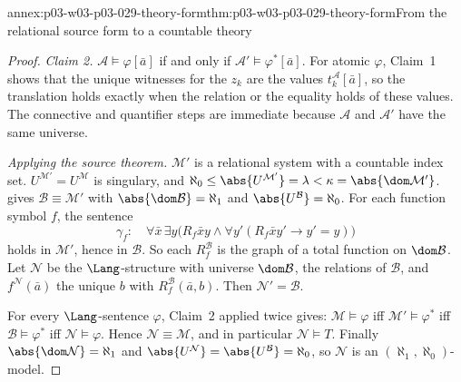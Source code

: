 \begin{annexitem}{annex:p03-w03-p03-029-theory-form}{thm:p03-w03-p03-029-theory-form}{From the relational source form to a countable theory}
\begin{proof}
\emph{Claim 2.} \(\mathcal A\models\varphi[\bar a]\) if and only if
\(\mathcal A'\models\varphi^*[\bar a]\). For atomic \(\varphi\), Claim~1
shows that the unique witnesses for the \(z_k\) are the values
\(t_k^{\mathcal A}[\bar a]\), so the translation holds exactly when the
relation or the equality holds of these values. The connective and
quantifier steps are immediate because \(\mathcal A\) and \(\mathcal A'\)
have the same universe.

\emph{Applying the source theorem.} \(\mathcal M'\) is a relational system
with a countable index set. \(U^{\mathcal M'}=U^{\mathcal M}\) is singulary,
and \(\aleph_0\leq\abs{U^{\mathcal M'}}=\lambda<\kappa=\abs{\dom\mathcal
M'}\).  gives \(\mathcal B\equiv\mathcal
M'\) with \(\abs{\dom\mathcal B}=\aleph_1\) and
\(\abs{U^{\mathcal B}}=\aleph_0\). For each function symbol \(f\), the
sentence
\[
  \gamma_f\colon\quad
  \forall\bar x\,\exists y\bigl(R_f\bar x y\wedge
  \forall y'(R_f\bar x y'\to y'=y)\bigr)
\]
holds in \(\mathcal M'\), hence in \(\mathcal B\). So each
\(R_f^{\mathcal B}\) is the graph of a total function on
\(\dom\mathcal B\). Let \(\mathcal N\) be the \(\Lang\)-structure with
universe \(\dom\mathcal B\), the relations of \(\mathcal B\), and
\(f^{\mathcal N}(\bar a)\) the unique \(b\) with
\(R_f^{\mathcal B}(\bar a,b)\). Then \(\mathcal N'=\mathcal B\).

For every \(\Lang\)-sentence \(\varphi\), Claim~2 applied twice gives:
\(\mathcal M\models\varphi\) iff \(\mathcal M'\models\varphi^*\) iff
\(\mathcal B\models\varphi^*\) iff \(\mathcal N\models\varphi\). Hence
\(\mathcal N\equiv\mathcal M\), and in particular \(\mathcal N\models T\).
Finally \(\abs{\dom\mathcal N}=\aleph_1\) and
\(\abs{U^{\mathcal N}}=\abs{U^{\mathcal B}}=\aleph_0\), so \(\mathcal N\)
is an \((\aleph_1,\aleph_0)\)-model.
\end{proof}
\end{annexitem}

